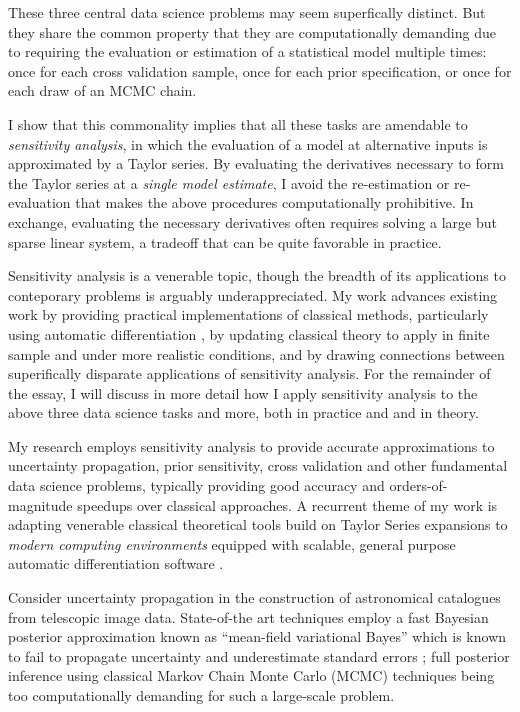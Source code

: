 These three central data science problems may seem superfically distinct.  But
they share the common property that they are computationally demanding due to
requiring the evaluation or estimation of a statistical model multiple times:
once for each cross validation sample, once for each prior specification, or
once for each draw of an MCMC chain.

I show that this commonality implies that all these tasks are amendable to {\em
sensitivity analysis}, in which the evaluation of a model at alternative inputs
is approximated by a Taylor series.  By evaluating the derivatives necessary to
form the Taylor series at a {\em single model estimate}, I avoid the
re-estimation or re-evaluation that makes the above procedures computationally
prohibitive.  In exchange, evaluating the necessary derivatives often requires
solving a large but sparse linear system, a tradeoff that can be quite favorable
in practice.

Sensitivity analysis is a venerable topic, though the breadth of its
applications to conteporary problems is arguably underappreciated.  My work
advances existing work by providing practical implementations of classical
methods, particularly using automatic differentiation
\citep{baydin:2015:automatic}, by updating classical theory to apply in finite
sample and under more realistic conditions, and by drawing connections between
superifically disparate applications of sensitivity analysis. For the remainder
of the essay, I will discuss in more detail how I apply sensitivity analysis to
the above three data science tasks and more, both in practice and and in theory.




\newpage

My research employs sensitivity analysis to provide accurate approximations to
uncertainty propagation, prior sensitivity, cross validation and other
fundamental data science problems, typically providing good accuracy and
orders-of-magnitude speedups over classical approaches.  A recurrent theme of my
work is adapting venerable classical theoretical tools build on Taylor Series
expansions  \citep{reeds:1976:thesis, gustafson:1996:localposterior,
opper:2001:advancedmeanfield} to {\em modern computing environments} equipped
with scalable, general purpose automatic differentiation software
\citep{baydin:2015:automatic, carpenter:2015:stanmath}.




Consider uncertainty propagation in the construction of astronomical catalogues
from telescopic image data. State-of-the art techniques employ a fast Bayesian
posterior approximation known as ``mean-field variational Bayes''
\citep{regier:2019:cataloging} which is known to fail to propagate uncertainty
and underestimate standard errors \citep{turner:2011:two}; full posterior
inference using classical Markov Chain Monte Carlo (MCMC) techniques being too
computationally demanding for such a large-scale problem.

